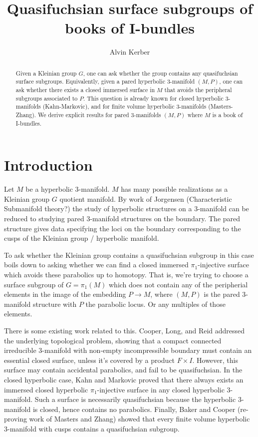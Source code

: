 \documentclass[12pt]{amsart}
\theoremstyle{definition}
\begin{document}
\title{Quasifuchsian surface subgroups of books of I-bundles}

\author{Alvin Kerber}

\begin{abstract} Given a Kleinian group $G$, one can ask whether the group
contains any quasifuchsian surface subgroups. Equivalently, given a pared
hyperbolic 3-manifold $(M,P)$, one can ask whether there exists a closed
immersed surface in $M$ that avoids the peripheral subgroups associated to $P$.
This question is already known for closed hyperbolic 3-manifolds
(Kahn-Markovic), and for finite volume hyperbolic 3-manifolds (Masters-Zhang).
We derive explicit results for pared 3-manifolds $(M,P)$ where $M$ is a book of
I-bundles. \end{abstract}

\maketitle
\section{Introduction}

Let $M$ be a hyperbolic 3-manifold. $M$ has many possible realizations as
a Kleinian group $G$ quotient manifold. By work of Jorgensen (Characteristic
Submanifold theory?) the study of hyperbolic structures on a 3-manifold can be
reduced to studying pared 3-manifold structures on the boundary. The pared
structure gives data specifying the loci on the boundary corresponding to the
cusps of the Kleinian group / hyperbolic manifold.

To ask whether the Kleinian group contains a quasifuchsian subgroup in this
case boils down to asking whether we can find a closed immersed
$\pi_1$-injective surface which avoids these parabolics up to homotopy. That
is, we're trying to choose a surface subgroup of $G=\pi_1(M)$ which does not
contain any of the peripherial elements in the image of the embedding $P\to M$,
where $(M,P)$ is the pared 3-manifold structure with $P$ the parabolic locus.
Or any multiples of those elements.

There is some existing work related to this. Cooper, Long, and Reid addressed
the underlying topological problem, showing that a compact connected
irreducible 3-manifold with non-empty incompressible boundary  must contain an
essential closed surface, unless it's covered by a product $F\times I$.
However, this surface may contain accidental parabolics, and fail to be
quasifuchsian.  In the closed hyperbolic case, Kahn and Markovic proved that
there always exists an immersed closed hyperbolic $\pi_1$-injective surface in
any closed hyperbolic 3-manifold. Such a surface is necessarily quasifuchsian
because the hyperbolic 3-manifold is closed, hence contains no parabolics.
Finally, Baker and Cooper (re-proving work of Masters and Zhang) showed that
every finite volume hyperbolic 3-manifold with cusps contains a quasifuchsian
subgroup.
\end{document}
